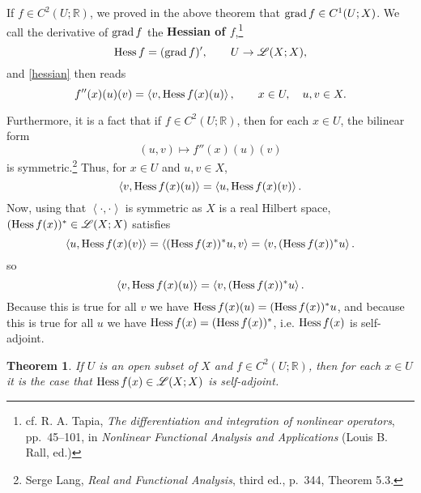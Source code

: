 \documentclass{article}
\newcommand{\inner}[2]{\left\langle #1, #2 \right\rangle}
\newcommand{\grad}{\ensuremath\mathrm{grad}\,}
\newcommand{\Hess}{\ensuremath\mathrm{Hess}\,}
\newtheorem{theorem}{Theorem}
\theoremstyle{definition}
\begin{document}
If $f \in C^2(U;\mathbb{R})$, we proved in the above theorem that
$\grad f \in C^1(U;X)$. We call the derivative of $\grad f$ the \textbf{Hessian of $f$},\footnote{cf. 
R. A. Tapia, {\em The differentiation and integration of nonlinear operators},
pp.~45--101, in {\em Nonlinear Functional Analysis and Applications} (Louis B. Rall, ed.)}
\[
\Hess f  = (\grad f)', \qquad U \to \mathscr{L}(X;X),
\]
and \eqref{hessian} then reads
\[
f''(x)(u)(v) = \inner{v}{\Hess f(x)(u)}, \qquad x \in U, \quad u,v \in X.
\]

Furthermore, it is a fact that if $f \in C^2(U;\mathbb{R})$, then for each $x \in U$, the bilinear form
\[
(u,v) \mapsto f''(x)(u)(v)
\]
is symmetric.\footnote{Serge Lang, {\em Real and Functional Analysis}, third ed.,
p.~344, Theorem 5.3.}
Thus, for $x \in U$ and $u,v \in X$,
\[
\inner{v}{\Hess f(x)(u)} = \inner{u}{\Hess f(x)(v)}.
\]
Now, using that $\inner{\cdot}{\cdot}$ is symmetric as $X$ is a real Hilbert space, $(\Hess f(x))^* \in \mathscr{L}(X;X)$ satisfies
\[
 \inner{u}{\Hess f(x)(v)} = \inner{(\Hess f(x))^*u}{v} = \inner{v}{(\Hess f(x))^*u}.
\]
so 
\[
\inner{v}{\Hess f(x)(u)} =  \inner{v}{(\Hess f(x))^*u}.
\]
Because this is true for all $v$ we have $\Hess f(x)(u)=(\Hess f(x))^*u$, and because this is true for all $u$ we have
$\Hess f(x)=(\Hess f(x))^*$, i.e. $\Hess f(x)$ is self-adjoint.

\begin{theorem}
If $U$ is an open  subset of $X$ and $f \in C^2(U;\mathbb{R})$, then
for each $x \in U$ it is the case that $\Hess f(x) \in \mathscr{L}(X;X)$ is self-adjoint.
\label{selfadjoint}
\end{theorem}
\end{document}
